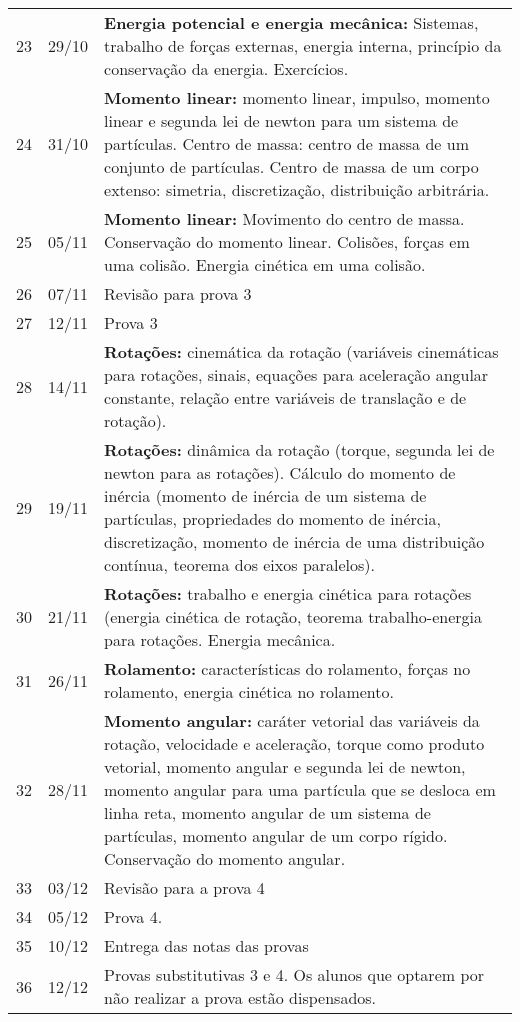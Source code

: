 \begin{center}
\begin{longtable}{ccp{70mm}}
 23 & 29/10 & \textbf{Energia potencial e energia mecânica:} Sistemas, trabalho de forças externas, energia interna, princípio da conservação da energia. Exercícios.\\
 24 & 31/10 & \textbf{Momento linear:} momento linear, impulso, momento linear e segunda lei de newton para um sistema de partículas. Centro de massa: centro de massa de um conjunto de partículas. Centro de massa de um corpo extenso: simetria, discretização, distribuição arbitrária. \\
 25 & 05/11 & \textbf{Momento linear:} Movimento do centro de massa. Conservação do momento linear. Colisões, forças em uma colisão. Energia cinética em uma colisão. \\
 26 & 07/11 & Revisão para prova 3\\
 27 & 12/11 & Prova 3\\
 28 & 14/11 & \textbf{Rotações:} cinemática da rotação (variáveis cinemáticas para rotações, sinais, equações para aceleração angular constante, relação entre variáveis de translação e de rotação).\\
 29 & 19/11 & \textbf{Rotações:} dinâmica da rotação (torque, segunda lei de newton para as rotações). Cálculo do momento de inércia (momento de inércia de um sistema de partículas, propriedades do momento de inércia, discretização, momento de inércia de uma distribuição contínua, teorema dos eixos paralelos). \\
 30 & 21/11 & \textbf{Rotações:} trabalho e energia cinética para rotações (energia cinética de rotação, teorema trabalho-energia para rotações. Energia mecânica.\\
 31 & 26/11 & \textbf{Rolamento:} características do rolamento, forças no rolamento, energia cinética no rolamento.\\
 32 & 28/11 & \textbf{Momento angular:} caráter vetorial das variáveis da rotação, velocidade e aceleração, torque como produto vetorial, momento angular e segunda lei de newton, momento angular para uma partícula que se desloca em linha reta, momento angular de um sistema de partículas, momento angular de um corpo rígido. Conservação do momento angular.\\
 33 & 03/12 & Revisão para a prova 4\\
 34 & 05/12 & Prova 4.\\
 35 & 10/12 & Entrega das notas das provas\\
 36 & 12/12 & Provas substitutivas 3 e 4. Os alunos que optarem por não realizar a prova estão dispensados.
\end{longtable}
\end{center}

